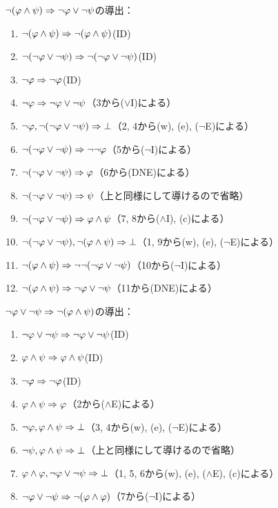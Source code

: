 \(\lnot \paren{\varphi \land \psi} \sequent \lnot \varphi \lor \lnot \psi\)の導出：
\begin{enumerate}
	\item \(\lnot \paren{\varphi \land \psi} \sequent \lnot \paren{\varphi \land \psi}\)\quad (ID)
	\item \(\lnot \paren{\lnot \varphi \lor \lnot \psi} \sequent \lnot \paren{\lnot \varphi \lor \lnot \psi}\)\quad (ID)
	\item \(\lnot \varphi \Rightarrow \lnot \varphi\)\quad (ID)
	\item \(\lnot \varphi \Rightarrow \lnot \varphi \lor \lnot \psi\)\quad （3から(\(\lor\)I)による）
	\item \(\lnot \varphi, \lnot \paren{\lnot \varphi \lor \lnot \psi} \sequent \bot\)\quad （2, 4から(w), (e), (\(\lnot\)E)による）
	\item \(\lnot \paren{\lnot \varphi \lor \lnot \psi} \sequent \lnot \lnot \varphi\)\quad （5から(\(\lnot\)I)による）
	\item \(\lnot \paren{\lnot \varphi \lor \lnot \psi} \sequent \varphi\)\quad （6から(DNE)による）
	\item \(\lnot \paren{\lnot \varphi \lor \lnot \psi} \sequent \psi\)\quad （上と同様にして導けるので省略）
	\item \(\lnot \paren{\lnot \varphi \lor \lnot \psi} \sequent \varphi \land \psi\)\quad （7, 8から(\(\land\)I), (c)による）
	\item \(\lnot \paren{\lnot \varphi \lor \lnot \psi}, \lnot \paren{\varphi \land \psi} \sequent \bot\)\quad （1, 9から(w), (e), (\(\lnot\)E)による）
	\item \(\lnot \paren{\varphi \land \psi} \sequent \lnot \lnot \paren{\lnot \varphi \lor \lnot \psi}\)\quad （10から(\(\lnot\)I)による）
	\item \(\lnot \paren{\varphi \land \psi} \sequent \lnot \varphi \lor \lnot \psi\)\quad （11から(DNE)による）
\end{enumerate}

\(\lnot \varphi \lor \lnot \psi \sequent \lnot \paren{\varphi \land \psi}\)の導出：
\begin{enumerate}
	\item \(\lnot \varphi \lor \lnot \psi \Rightarrow \lnot \varphi \lor \lnot \psi\)\quad (ID)
	\item \(\varphi \land \psi \Rightarrow \varphi \land \psi\)\quad (ID)
	\item \(\lnot \varphi \Rightarrow \lnot \varphi\)\quad (ID)
	\item \(\varphi \land \psi \Rightarrow \varphi\)\quad （2から(\(\land\)E)による）
	\item \(\lnot \varphi, \varphi \land \psi \Rightarrow \bot\)\quad （3, 4から(w), (e), (\(\lnot\)E)による）
	\item \(\lnot \psi, \varphi \land \psi \Rightarrow \bot\)\quad （上と同様にして導けるので省略）
	\item \(\varphi \land \varphi, \lnot \varphi \lor \lnot \psi \Rightarrow \bot\)\quad （1, 5, 6から(w), (e), (\(\land\)E), (c)による）
	\item \(\lnot \varphi \lor \lnot \psi \sequent \lnot \paren{\varphi \land \varphi}\)\quad （7から(\(\lnot\)I)による）
\end{enumerate}

